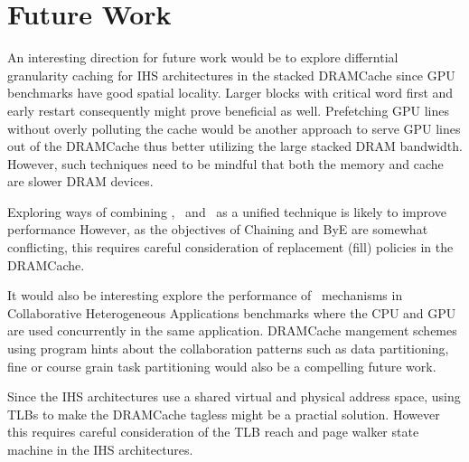 \section{Future Work}
An interesting direction for future work would be to explore differntial granularity caching for IHS architectures in the stacked DRAMCache since GPU benchmarks have good spatial locality. Larger blocks with critical word first and early restart consequently might prove beneficial as well. Prefetching GPU lines without overly polluting the cache would be another approach to serve GPU lines out of the DRAMCache thus better utilizing the large stacked DRAM bandwidth. However, such techniques need to be mindful that both the memory and cache are slower DRAM devices. 
\par Exploring ways of combining \prioname, \chaining\ and \bypassname\ as a unified technique is likely to improve performance However, as the objectives of Chaining and ByE are somewhat conflicting, this requires careful consideration of replacement (fill) policies in the DRAMCache.
\par It would also be interesting explore the performance of \cachename\ mechanisms in Collaborative Heterogeneous Applications benchmarks \cite{chai} where the CPU and GPU are used concurrently in the same application. DRAMCache mangement schemes using program hints about the collaboration patterns such as data partitioning, fine or course grain task partitioning would also be a compelling future work.
\par Since the IHS architectures use a shared virtual and physical address space, using TLBs to make the DRAMCache tagless might be a practial solution. However this requires careful consideration of the TLB reach and page walker state machine in the IHS architectures.
